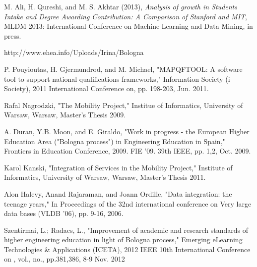 \documentclass[12pt,a4paper,oneside]{book}
\begin{document}
	
	
	
	
	




\begin{thebibliography}{10}

M. Ali, H. Qureshi, and M. S. Akhtar (2013), \emph{Analysis of growth in Students Intake and Degree Awarding Contribution: A Comparison of Stanford and MIT}, MLDM 2013: International Conference on Machine Learning and Data Mining, in press.

http://www.ehea.info/Uploads/Irina/Bologna%

P. Pouyioutas, H. Gjermundrod, and M. Michael, "MAPQFTOOL: A software tool to support national qualifications frameworks," Information Society (i-Society), 2011 International Conference on, pp. 198-203, Jun. 2011.

Rafal Nagrodzki, "The Mobility Project," Institue of Informatics, University of Warsaw, Warsaw, Master's Thesis 2009.

A. Duran, Y.B. Moon, and E. Giraldo, "Work in progress - the European Higher Education Area ("Bologna process") in Engineering Education in Spain," Frontiers in Education Conference, 2009. FIE '09. 39th IEEE, pp. 1,2, Oct. 2009.

Karol Kanski, "Integration of Services in the Mobility Project," Institute of Informatics, University of Warsaw, Warsaw, Master's Thesis 2011.

Alon Halevy, Anand Rajaraman, and Joann Ordille, "Data integration: the teenage years," In Proceedings of the 32nd international conference on Very large data bases (VLDB '06), pp. 9-16, 2006.

Szentirmai, L.; Radacs, L., "Improvement of academic and research standards of higher engineering education in light of Bologna process," Emerging eLearning Technologies \& Applications (ICETA), 2012 IEEE 10th International Conference on , vol., no., pp.381,386, 8-9 Nov. 2012


\end{thebibliography}
\end{document}
